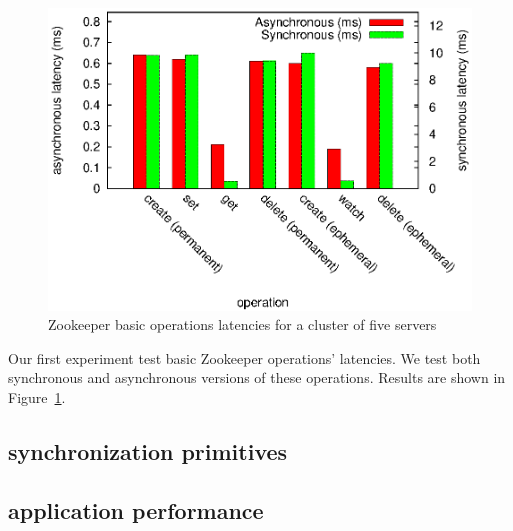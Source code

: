 \begin{figure}[h]
\centering
\includegraphics[scale=0.75]{img/ops_latencies.eps}
\caption{Zookeeper basic operations latencies for a cluster of five servers}
\label{fig:ops_latencies}
\end{figure}

Our first experiment test basic Zookeeper operations' latencies. We test both synchronous and asynchronous versions of these operations. Results are shown in Figure~\ref{fig:ops_latencies}.

\subsection{synchronization primitives}

\subsection{application performance}

